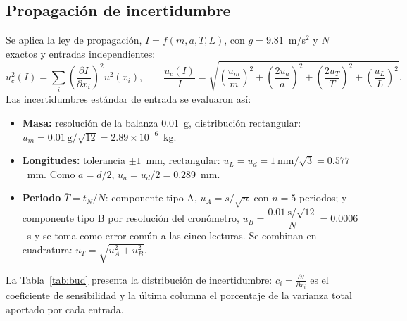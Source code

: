 \subsection*{Propagación de incertidumbre}
Se aplica la ley de propagación, $I=f(m,a,T,L)$, con $g=9.81$~m/s$^2$ y $N$ exactos y entradas independientes:
\begin{equation*}
u_c^2(I)=\sum_i\left(\frac{\partial I}{\partial x_i}\right)^{2}u^2(x_i),\qquad
\frac{u_c(I)}{I}=\sqrt{\left(\frac{u_m}{m}\right)^{2}+\left(\frac{2u_a}{a}\right)^{2}+\left(\frac{2u_T}{T}\right)^{2}+\left(\frac{u_L}{L}\right)^{2}}.
\end{equation*}
Las incertidumbres estándar de entrada se evaluaron así:
\begin{itemize}
\item \textbf{Masa:} resolución de la balanza 0.01~g, distribución rectangular: $u_m=0.01~\text{g}/\sqrt{12}=2.89\times10^{-6}$~kg.
\item \textbf{Longitudes:} tolerancia $\pm1$~mm, rectangular: $u_L=u_d=1~\text{mm}/\sqrt3=0.577$~mm. Como $a=d/2$, $u_a=u_d/2=0.289$~mm.
\item \textbf{Periodo} $\bar T=\bar t_N/N$: componente tipo A, $u_A=s/\sqrt{n}$ con $n=5$ periodos; y componente tipo B por resolución del cronómetro, $u_B=\dfrac{0.01~\text{s}/\sqrt{12}}{N}=0.0006$~s y se toma como error común a las cinco lecturas. Se combinan en cuadratura: $u_T=\sqrt{u_A^2+u_B^2}$.
\end{itemize}
La Tabla~\ref{tab:bud} presenta la distribución de incertidumbre: $c_i=\frac{\partial I}{\partial x_i}$ es el coeficiente de sensibilidad y la última columna el porcentaje de la varianza total aportado por cada entrada.

